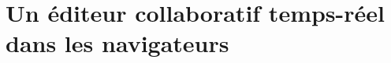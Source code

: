 
\chapter{Un éditeur collaboratif temps-réel dans les navigateurs}
\label{editor:chap:crate}
\minitoc









